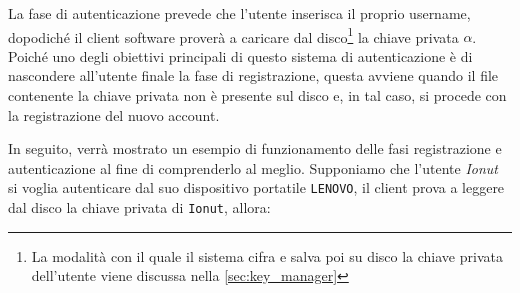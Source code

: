 La fase di autenticazione prevede che l'utente inserisca il proprio username, dopodiché il client software proverà a caricare dal disco\footnote{La modalità con il quale il sistema cifra e salva poi su disco la chiave privata dell'utente viene discussa nella \autoref{sec:key_manager}} la chiave privata $\alpha$. Poiché uno degli obiettivi principali di questo sistema di autenticazione è di nascondere all'utente finale la fase di registrazione, questa avviene quando il file contenente la chiave privata non è presente sul disco e, in tal caso, si procede con la registrazione del nuovo account.

In seguito, verrà mostrato un esempio di funzionamento delle fasi registrazione e autenticazione al fine di comprenderlo al meglio. Supponiamo che l'utente \textit{Ionut} si voglia autenticare dal suo dispositivo portatile \texttt{LENOVO}, il client prova a leggere dal disco la chiave privata di \texttt{Ionut}, allora:

